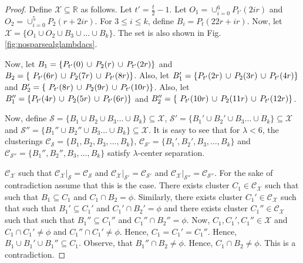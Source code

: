 \documentclass[anon,12pt]{colt2016} %
\newcommand{\mc}{\mathcal}
\begin{document}
\begin{proof}
Define $\mc X \subseteq \mathbb{R}$ as follows. Let $t' = \frac{t}{2}-1$. Let $O_1 = \cup_{i=0}^6 P_{t'}(2ir)$ and $O_2 = \cup_{i=0}^5 P_2(r+2ir)$. For $3\le i\le k$, define $B_i = P_t(22r+ir)$. Now, let $\mc X = \{O_1 \cup O_2 \cup B_3 \cup \ldots \cup B_k\}$. The set is also shown in Fig. \ref{fig:nosparsealglambdacs}.

Now, let $B_1 = \{P_{t'}(0) \thinspace\cup\thinspace  P_{2}(r) \thinspace\cup\thinspace P_{t'}(2r) \}$ and $B_2 = \{\ P_{t'}(6r) \thinspace\cup\thinspace P_{2}(7r)\thinspace\cup\thinspace P_{t'}(8r)\}$. Also, let $B_1' = \{P_{t'}(2r) \thinspace\cup\thinspace  P_{2}(3r) \thinspace\cup\thinspace P_{t'}(4r) \}$ and $B_2' = \{\ P_{t'}(8r) \thinspace\cup\thinspace P_{2}(9r)\thinspace\cup\thinspace P_{t'}(10r)\}$. Also, let $B_1'' = \{P_{t'}(4r) \thinspace\cup\thinspace  P_{2}(5r) \thinspace\cup\thinspace P_{t'}(6r) \}$ and $B_2'' = \{\ P_{t'}(10r) \thinspace\cup\thinspace P_{2}(11r)\thinspace\cup\thinspace P_{t'}(12r)\}$. 

Now, define $\mc S = \{B_1 \cup B_2 \cup B_3\ldots \cup B_k\} \subseteq \mc X$, $\mc S' = \{B_1' \cup B_2' \cup B_3\ldots \cup B_k\} \subseteq \mc X$ and $\mc S'' = \{B_1'' \cup B_2'' \cup B_3\ldots \cup B_k\} \subseteq \mc X$. It is easy to see that for $\lambda < 6$, the clusterings $\mc C_{\mc S} = \{B_1, B_2, B_3, \ldots, B_k\}$, $\mc C_{\mc S'} = \{B_1', B_2', B_3, \ldots, B_k\}$ and $\mc C_{\mc S''} = \{B_1'', B_2'', B_3, \ldots, B_k\}$ satisfy $\lambda$-center separation.

$\mc C_{\mc X}$ such that $\mc C_{\mc X}|_{\mc S} = \mc C_{\mc S}$ and $\mc C_{\mc X}|_{\mc S'} = \mc C_{\mc S'}$ and $\mc C_{\mc X}|_{\mc S''} = \mc C_{\mc S''}$. For the sake of contradiction assume that this is the case. There exists cluster $C_1 \in \mc C_{\mc X}$ such that such that $B_1 \subseteq C_1$ and $C_1 \cap B_2 = \phi$. Similarly, there exists cluster $C_1' \in \mc C_{\mc X}$ such that such that $B_1' \subseteq C_1'$ and $C_1' \cap B_2' = \phi$ and there exists cluster $C_1'' \in \mc C_{\mc X}$ such that such that $B_1'' \subseteq C_1''$ and $C_1'' \cap B_2'' = \phi$. Now, $C_1, C_1', C_1'' \in \mc X$ and $C_1 \cap C_1' \neq \phi$ and $C_1'' \cap C_1' \neq \phi$. Hence, $C_1 = C_1' = C_1''$. Hence, $B_1 \cup B_1' \cup B_1'' \subseteq C_1$. Observe, that $B_1'' \cap B_2 \neq \phi$. Hence, $C_1\cap B_2 \neq \phi$. This is a contradiction.
\end{proof}

\end{document}
